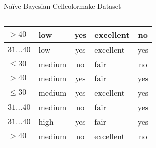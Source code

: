 \begin{frame}{Naïve Bayesian Cellcolormake Dataset}
\begin{columns}
\begin{column}{0.6\textwidth}
{\begin{tabular}{|l|l|c|l|c|}
          \cellcolor{yellow!20}$>40$ & \cellcolor{yellow!20}low & \cellcolor{yellow!20}yes & \cellcolor{yellow!20}excellent & \cellcolor{red!20}no \\\hline
          \cellcolor{yellow!20}$31\ldots40$ & \cellcolor{yellow!20}low & \cellcolor{yellow!20}yes & \cellcolor{yellow!20}excellent & \cellcolor{green!20}yes \\\hline
          \cellcolor{yellow!20}$\leq30$ & \cellcolor{yellow!20}medium & \cellcolor{yellow!20}no & \cellcolor{yellow!20}fair & \cellcolor{red!20}no \\\hline
          \cellcolor{yellow!20}$>40$ & \cellcolor{yellow!20}medium & \cellcolor{yellow!20}yes & \cellcolor{yellow!20}fair & \cellcolor{green!20}yes \\\hline
          \cellcolor{yellow!20}$\leq30$ & \cellcolor{yellow!20}medium & \cellcolor{yellow!20}yes & \cellcolor{yellow!20}excellent & \cellcolor{green!20}yes \\\hline
          \cellcolor{yellow!20}$31\ldots40$ & \cellcolor{yellow!20}medium & \cellcolor{yellow!20}no & \cellcolor{yellow!20}fair & \cellcolor{green!20}yes \\\hline
          \cellcolor{yellow!20}$31\ldots40$ & \cellcolor{yellow!20}high & \cellcolor{yellow!20}yes & \cellcolor{yellow!20}fair & \cellcolor{green!20}yes \\\hline
          \cellcolor{yellow!20}$>40$ & \cellcolor{yellow!20}medium & \cellcolor{yellow!20}no & \cellcolor{yellow!20}excellent & \cellcolor{red!20}no \\\hline
        \end{tabular}}
    \end{column}
  \end{columns}
\end{frame}

